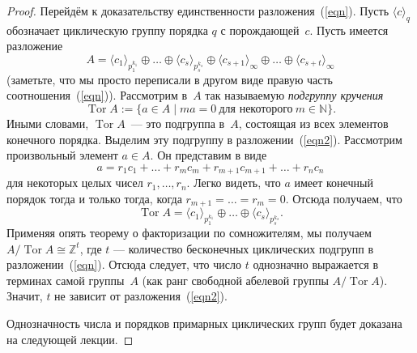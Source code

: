 \documentclass[a4paper,10pt]{amsart}
\DeclareMathOperator{\Tor}{\mathrm{Tor}}
\def\ZZ{{\mathbb Z}}%
\def\NN{{\mathbb N}}%
\theoremstyle{definition}
\theoremstyle{remark}
\begin{document}
\begin{proof}
Перейдём к доказательству единственности разложения~(\ref{eqn}).
Пусть $\langle c \rangle_q$ обозначает циклическую группу порядка
$q$ с порождающей~$c$. Пусть имеется разложение
\begin{equation} \label{eqn2}
A = \langle c_1\rangle_{p_1^{k_1}} \oplus \ldots \oplus \langle c_s
\rangle_{p_s^{k_s}} \oplus \langle c_{s+1} \rangle_{\infty} \oplus
\ldots \oplus \langle c_{s+t} \rangle_{\infty}
\end{equation}
(заметьте, что мы просто переписали в другом виде правую часть
соотношения~(\ref{eqn})). Рассмотрим в~$A$ так называемую {\it
подгруппу кручения}
$$
\Tor A := \{ a \in A \mid ma=0 \ \text{для некоторого} \ m \in \NN
\}.
$$
Иными словами, $\Tor A$~--- это подгруппа в~$A$, состоящая из всех
элементов конечного порядка. Выделим эту подгруппу в
разложении~(\ref{eqn2}). Рассмотрим произвольный элемент $a \in A$.
Он представим в виде
$$
a = r_1c_1 + \ldots + r_m c_m + r_{m+1} c_{m+1} + \ldots + r_n c_n
$$
для некоторых целых чисел $r_1, \ldots, r_n$. Легко видеть, что $a$
имеет конечный порядок тогда и только тогда, когда $r_{m+1} = \ldots
= r_m = 0$. Отсюда получаем, что
\begin{equation} \label{eqn3}
\Tor A = \langle c_1 \rangle_{p_1^{k_1}} \oplus \ldots \oplus
\langle c_s \rangle_{p_s^{k_s}}.
\end{equation}
Применяя опять теорему о факторизации по сомножителям, мы получаем
$A / \Tor A \cong \ZZ^t$, где $t$ --- количество бесконечных 
циклических подгрупп в разложении~(\ref{eqn}). Отсюда следует, 
что число $t$ однозначно выражается в терминах самой группы~$A$ 
(как ранг свободной абелевой группы $A / \Tor A$). Значит, $t$ 
не зависит от разложения~(\ref{eqn2}).

Однозначность числа и порядков примарных циклических
групп будет доказана на следующей лекции.



\end{proof}
\end{document}
